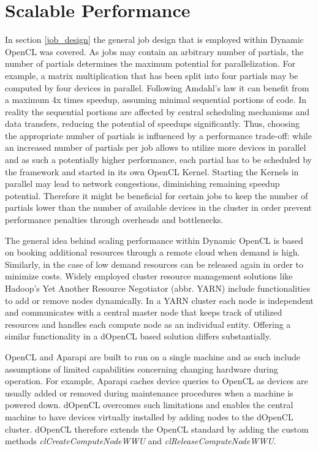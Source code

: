 \section{Scalable Performance}
\label{scalable_performance}
In section \ref{job_design} the general job design that is employed within Dynamic OpenCL was covered. As jobs may contain an arbitrary number of partials, the number of partials determines the maximum potential for parallelization. For example, a matrix multiplication that has been split into four partials may be computed by four devices in parallel. Following Amdahl's law it can benefit from a maximum 4x times speedup\cite{amdahl}, assuming minimal sequential portions of code. In reality the sequential portions are affected by central scheduling mechanisms and data transfers, reducing the potential of speedups significantly. Thus, choosing the appropriate number of partials is influenced by a performance trade-off: while an increased number of partials per job allows to utilize more devices in parallel and as such a potentially higher performance, each partial has to be scheduled by the framework and started in its own OpenCL Kernel. Starting the Kernels in parallel may lead to network congestions, diminishing remaining speedup potential. Therefore it might be beneficial for certain jobs to keep the number of partials lower than the number of available devices in the cluster in order prevent performance penalties through overheads and bottlenecks.

The general idea behind scaling performance within Dynamic OpenCL is based on booking additional resources through a remote cloud when demand is high. Similarly, in the case of low demand resources can be released again in order to minimize costs. Widely employed cluster resource management solutions like Hadoop's Yet Another Resource Negotiator (abbr. YARN) include functionalities to add or remove nodes dynamically. In a YARN cluster each node is independent and communicates with a central master node that keeps track of utilized resources and handles each compute node as an individual entity. Offering a similar functionality in a dOpenCL based solution differs substantially.

OpenCL and Aparapi are built to run on a single machine and as such include assumptions of limited capabilities concerning changing hardware during operation. For example, Aparapi caches device queries to OpenCL as devices are usually added or removed during maintenance procedures when a machine is powered down. dOpenCL overcomes such limitations and enables the central machine to have devices virtually installed by adding nodes to the dOpenCL cluster. dOpenCL therefore extends the OpenCL standard by adding the custom methods \textit{clCreateComputeNodeWWU} and \textit{clReleaseComputeNodeWWU}.

